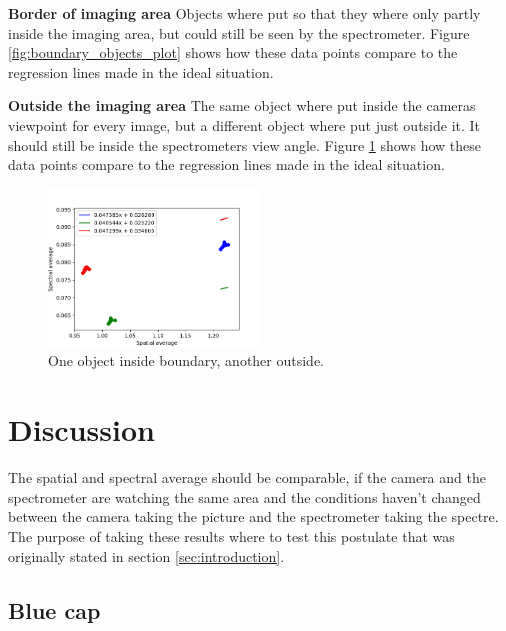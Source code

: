 \textbf{Border of imaging area}
Objects where put so that they where only partly inside the imaging area, but could still be seen by the spectrometer. Figure \ref{fig:boundary_objects_plot} shows how these data points compare to the regression lines made in the ideal situation.

\textbf{Outside the imaging area}
The same object where put inside the cameras viewpoint for every image, but a different object where put just outside it. It should still be inside the spectrometers view angle. Figure \ref{fig:outside_objects_plot} shows how these data points compare to the regression lines made in the ideal situation.

\begin{figure}[h]
    \centering
    \includegraphics[width=0.5\textwidth]{Plots/spectral_vs_spatial_average_with_regression_outside_objects.png}
    \caption{One object inside boundary, another outside.}
    \label{fig:outside_objects_plot}
\end{figure}


\section{Discussion}
The spatial and spectral average should be comparable, if the camera and the spectrometer are watching the same area and the conditions haven't changed between the camera taking the picture and the spectrometer taking the spectre. The purpose of taking these results where to test this postulate that was originally stated in section \ref{sec:introduction}.

\subsection{Blue cap}
\label{sec:blue_cap_discussion}

